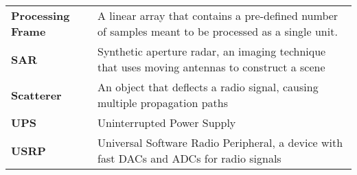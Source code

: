 \begin{longtable}{>{\raggedleft\arraybackslash}p{3.5cm}p{11cm}}
\bfseries{Processing Frame} & A linear array that contains a pre-defined number of samples meant to be processed as a single unit.\\
\bfseries{SAR} & Synthetic aperture radar, an imaging technique that uses moving antennas to construct a scene\\
\bfseries{Scatterer} & An object that deflects a radio signal, causing multiple propagation paths\\
\bfseries{UPS} & Uninterrupted Power Supply\\
\bfseries{USRP} & Universal Software Radio Peripheral, a device with fast DACs and ADCs for radio signals\\
\end{longtable}
